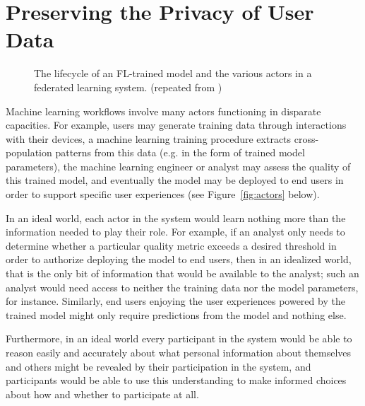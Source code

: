 \documentclass[11pt]{article}
\newcommand{\repeatcaption}[2]{%
  \renewcommand{\thefigure}{\ref{#1}}%
  \captionsetup{list=no}%
  \caption{#2 (repeated from \cpageref{#1})}%
  \addtocounter{figure}{-1}%
}
\begin{document}
\pagebreak
\section{Preserving the Privacy of User Data}
\label{sec:privacy}

\begin{figure}[b!] 
\noindent\usebox{\actorsfigure}
\repeatcaption{fig:actors}{The lifecycle of an FL-trained model and the various actors in a federated learning system.
\label{fig:actors_repeat}
} 
\end{figure}


Machine learning workflows involve many actors functioning in disparate capacities.  For example, users may generate training data through interactions with their devices, a machine learning training procedure extracts cross-population patterns from this data (e.g. in the form of trained model parameters), the machine learning engineer or analyst may assess the quality of this trained model, and eventually the model may be deployed to end users in order to support specific user experiences (see Figure~\ref{fig:actors} below).  

In an ideal world, each actor in the system would learn nothing more than the information needed to play their role.  For example, if an analyst only needs to determine whether a particular quality metric exceeds a desired threshold in order to authorize deploying the model to end users, then in an idealized world, that is the only bit of information that would be available to the analyst; such an analyst would need access to neither the training data nor the model parameters, for instance.  Similarly, end users enjoying the user experiences powered by the trained model might only require predictions from the model and nothing else.

Furthermore, in an ideal world every participant in the system would be able to reason easily and accurately about what personal information about themselves and others might be revealed by their participation in the system, and participants would be able to use this understanding to make informed choices about how and whether to participate at all.
\end{document}
